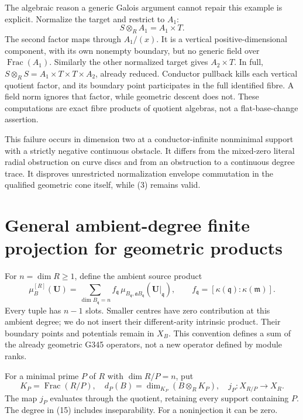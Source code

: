 \documentclass[11pt]{article}
\begin{document}
The algebraic reason a generic Galois argument cannot repair this
example is explicit. Normalize the target and restrict to \(A_1\):
\[
 S\otimes_R A_1=A_1\times T.
\]
The second factor maps through \(A_1/(x)\). It is a vertical
positive-dimensional component, with its own nonempty boundary,
but no generic field over \(\operatorname{Frac}(A_1)\).
Similarly the other normalized target gives \(A_2\times T\).
In full, \(S\otimes_R S=A_1\times T\times T\times A_2\),
already reduced. Conductor pullback kills each vertical quotient
factor, and its boundary point participates in the full identified
fibre. A field norm ignores that factor, while geometric descent
does not. These computations are exact fibre products of quotient
algebras, not a flat-base-change assertion.

This failure occurs in dimension two at a conductor-infinite
nonminimal support with a strictly negative continuous obstacle.
It differs from the mixed-zero literal radial obstruction on
curve discs and from an obstruction to a continuous degree trace.
It disproves unrestricted normalization envelope commutation in the
qualified geometric cone itself, while (3) remains valid.

\section{General ambient-degree finite projection for geometric products}
\label{sec:projection}
For \(n=\dim R\geq1\), define the ambient source product
\[
 \mu_B^{[R]}(\boldsymbol U)
   =\sum_{\dim B_{\mathfrak q}=n}
       f_{\mathfrak q}\,\mu_{B_{\mathfrak q},\mathfrak aB_{\mathfrak q}}
                          (\boldsymbol U|_{\mathfrak q}),\qquad
 f_{\mathfrak q}=[\kappa(\mathfrak q):\kappa(\mathfrak m)].
                                                               \tag{14}
\]
Every tuple has \(n-1\) slots. Smaller centres have zero contribution
at this ambient degree; we do not insert their different-arity
intrinsic product. Their boundary points and potentials remain in
\(X_B\). This convention defines a sum of the already geometric
G345 operators, not a new operator defined by module ranks.

For a minimal prime \(P\) of \(R\) with \(\dim R/P=n\), put
\[
 K_P=\operatorname{Frac}(R/P),\quad
 d_P(B)=\dim_{K_P}(B\otimes_R K_P),\quad
 j_P:X_{R/P}\longrightarrow X_R .
                                                               \tag{15}
\]
The map \(j_P\) evaluates through the quotient, retaining every
support containing \(P\). The degree in (15) includes inseparability.
For a noninjection it can be zero.
\end{document}
